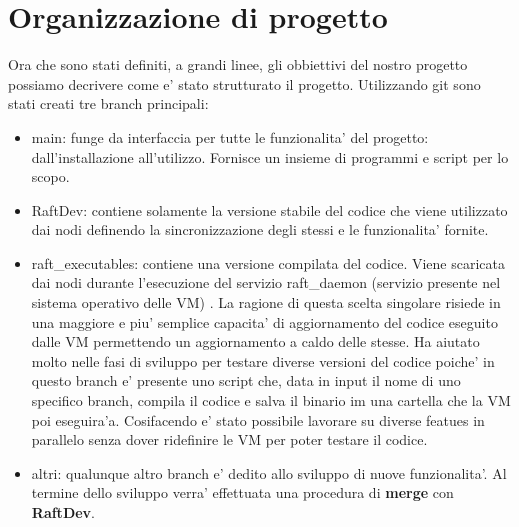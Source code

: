 \section{Organizzazione di progetto}
Ora che sono stati definiti, a grandi linee, gli obbiettivi del nostro progetto possiamo
decrivere come e' stato strutturato il progetto. 
Utilizzando git sono stati creati tre branch principali:
\begin{itemize}
    \item main: funge da interfaccia per tutte le funzionalita' del progetto:
                dall'installazione all'utilizzo. Fornisce un insieme di programmi e script
                per lo scopo.
    \item RaftDev:  contiene solamente la versione stabile del codice che viene utilizzato dai nodi
                    definendo la sincronizzazione degli stessi e le funzionalita' fornite.
    \item raft\_executables: contiene una versione compilata del codice. Viene scaricata dai nodi
        durante l'esecuzione del servizio raft\_daemon (servizio presente nel sistema operativo 
                             delle VM) . La ragione di questa 
                             scelta singolare risiede in una maggiore e piu' semplice capacita' di
                             aggiornamento del codice eseguito dalle VM permettendo un aggiornamento
                             a caldo delle stesse. Ha aiutato molto nelle fasi di sviluppo per testare
                             diverse versioni del codice poiche' in questo branch e' presente uno script
                             che, data in input il nome di uno specifico branch, compila il codice
                             e salva il binario im una cartella che la VM poi eseguira'a.
                             Cosifacendo e' stato possibile lavorare su diverse featues in parallelo
                             senza dover ridefinire le VM per poter testare il codice.
    \item altri:    qualunque altro branch e' dedito allo sviluppo di nuove funzionalita'. Al termine
                    dello sviluppo verra' effettuata una procedura di \textbf{merge} con 
                    \textbf{RaftDev}.
\end{itemize}
